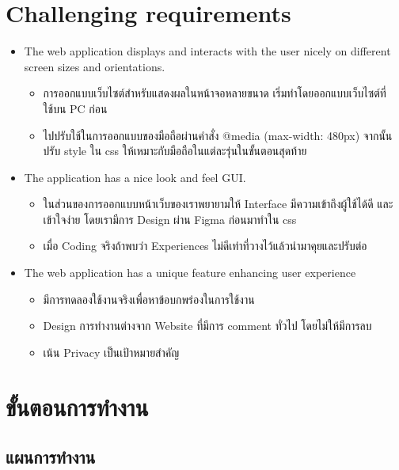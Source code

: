 \documentclass[17pt]{extarticle}
\begin{document}
\section{Challenging requirements}

\begin{itemize}
    \item The web application displays and interacts with the user nicely on different screen sizes and orientations.
          \begin{itemize}
              \item การออกแบบเว็บไซต์สำหรับแสดงผลในหน้าจอหลายขนาด เริ่มทำโดยออกแบบเว็บไซต์ที่ใช้บน PC ก่อน
              \item ไปปรับใช้ในการออกแบบของมือถือผ่านคำสั่ง @media (max-width: 480px) จากนั้นปรับ style ใน css ให้เหมาะกับมือถือในแต่ละรุ่นในขั้นตอนสุดท้าย
          \end{itemize}
    \item The application has a nice look and feel GUI.
          \begin{itemize}
              \item ในส่วนของการออกแบบหน้าเว็บของเราพยายามให้ Interface มีความเข้าถึงผู้ใช้ได้ดี และเข้าใจง่าย โดยเรามีการ Design ผ่าน Figma ก่อนมาทำใน css
              \item เมื่อ Coding จริงถ้าพบว่า Experiences ไม่ดีเท่าที่วางไว้แล้วนำมาคุยและปรับต่อ
          \end{itemize}
    \item The web application has a unique feature enhancing user experience
          \begin{itemize}
              \item มีการทดลองใช้งานจริงเพื่อหาข้อบกพร่องในการใช้งาน
              \item Design การทำงานต่างจาก Website ที่มีการ comment ทั่วไป โดยไม่ให้มีการลบ
              \item เน้น Privacy เป็นเป้าหมายสำคัญ
          \end{itemize}
\end{itemize}
\pagebreak
\section{ขั้นตอนการทำงาน}
\subsection{แผนการทำงาน}
\label{sec:plan}
\end{document}
